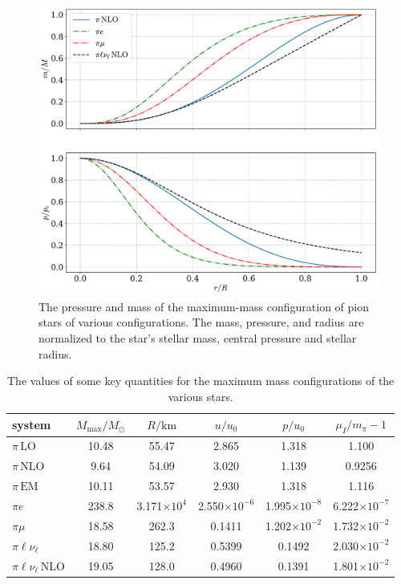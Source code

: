 \begin{figure}[!htb]
    \centering
    \includegraphics[width=.95\textwidth]{../scripts/figurer/pion_star/max_pressure_mass.pdf}
    \caption{
        The pressure and mass of the maximum-mass configuration of pion stars of various configurations.
        The mass, pressure, and radius are normalized to the star's stellar mass, central pressure and stellar radius.
        }
        \label{fig: max pressure and mass}
\end{figure}

\begin{table}[!htb]
    \centering
    \caption{The values of some key quantities for the maximum mass configurations of the various stars.}
    \label{table: key values}
    \begin{tabular}{l  c  c  c  c  c}
        \hline \hline
        system & $M_\text{max}/M_\odot$ & $R / \text{km}$ & 
        $u/u_0$ & $p/u_0$ & $\mu_I/m_\pi-1$ \\
        \hline
        $\pi\, \text{LO}$& 10.48 & 55.47 & 2.865 & 1.318 & 1.100 \\
        $\pi\, \text{NLO}$& 9.64 & 54.09 & 3.020 & 1.139 & 0.9256 \\
        $\pi\, \text{EM}$& 10.11 & 53.57 & 2.930 & 1.318 & 1.116 \\
        $\pi e$& 238.8 & 3.171$\times10^4$ & 
        2.550$\times10^{-6}$ & 1.995$\times10^{-8}$ & 
        6.222$\times10^{-7}$ \\
        $\pi \mu$& 18.58 & 262.3 & 
        0.1411 & 1.202$\times 10^{-2}$ &
        1.732$\times10^{-2}$ \\
        $\pi  \ell  \nu_\ell$& 18.80 & 125.2 &
        0.5399  & 0.1492 &
        2.030$\times10^{-2}$ \\
        $\pi  \ell \nu_\ell\,\text{NLO}$& 19.05 & 128.0 &
        0.4960  & 0.1391 &
        1.801$\times10^{-2}$ \\
        \hline
    \end{tabular}
\end{table}



